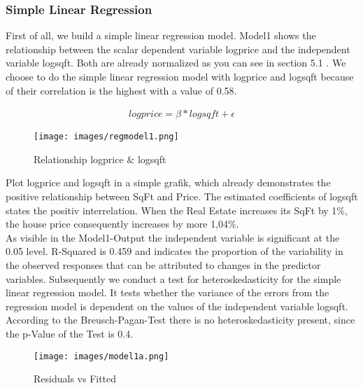 \subsubsection{Simple Linear Regression}


First of all, we build a simple linear regression model. Model1 shows the relationship between the scalar dependent variable logprice and the independent variable logsqft. Both are already normalized as you can see in section 5.1 . We choose to do the simple linear regression model with logprice and logsqft because of their correlation is the highest with a value of 0.58. 


\begin{align}
logprice = \beta * logsqft + \epsilon 
\end{align}



 \begin{figure}[ht]
\begin{flushleft}
\centering
	\texttt{[image: images/regmodel1.png]}
	\caption{Relationship logprice \& logsqft}
\end{flushleft}
\label{}
\end{figure}



Plot logprice and logsqft in a simple grafik, which already demonstrates the positive relationship between SqFt and Price. The estimated coefficients of logsqft states the positiv interrelation. When the Real Estate increases its SqFt by 1\%, the house price consequently increases by more 1,04\%.  \\

As visible in the Model1-Output the independent variable is significant at the 0.05 level. 
R-Squared is 0.459 and indicates the proportion of the variability in the observed responses that can be attributed to changes in the predictor variables. 
Subsequently we conduct a test for heteroskedasticity for the simple linear regression model. It tests whether the variance of the errors from the regression model is dependent on the values of the independent variable logsqft. According to the Breusch-Pagan-Test there is no heteroskedasticity present, since the p-Value of the Test is 0.4. \\


 \begin{figure}[ht]
\begin{flushleft}
\centering
	\texttt{[image: images/model1a.png]}
	\caption{Residuals vs Fitted}
\end{flushleft}
\label{}
\end{figure}

